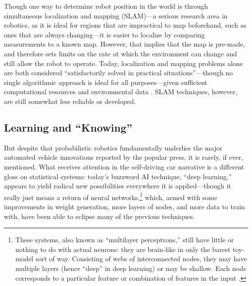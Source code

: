 

Though one way to determine robot position in the world is through
simultaneous localization and mapping (SLAM)---a serious research area in
robotics, as it is ideal for regions that are impractical to map
beforehand, such as ones that are always changing---it is easier to localize by comparing
measurements to a known map. However, that implies that the map is
pre-made, and therefore sets limits on the rate at which the
environment can change and still allow the robot to operate. Today, localization and
mapping problems alone are both considered ``satisfactorily solved in practical
situations''---though no single algorithmic approach is ideal for all purposes---given sufficient
computational resources and environmental data \cite[p.
  5-6]{SLAMbook}. SLAM techniques, however,
are still somewhat less reliable or developed.





\subsection{Learning and ``Knowing''}

But despite that probabilistic robotics fundamentally
underlies the major automated vehicle innovations reported by the
popular press, it is rarely, if ever, mentioned. What receives attention in the
self-driving car narrative is a different gloss on statistical
systems: today's buzzword
AI technique, ``deep learning,'' appears to yield
radical new possibilities everywhere it is 
applied---though it really just means a return of neural
networks,\footnote{These systems, also known as
``multilayer perceptrons,'' still have little or nothing to do
  with actual neurons: they are brain-like in only the barest
  toy-model sort of way. Consisting of webs of interconnected
nodes, they may have multiple layers (hence ``deep'' in deep learning)
or may be shallow. Each node 
corresponds to a particular feature or combination of features in the
input \cite{neuralJordan}.} which, armed with some improvements in weight generation,
more layers of
nodes, and more data to train with, have been able to eclipse many of
the previous techniques. 


